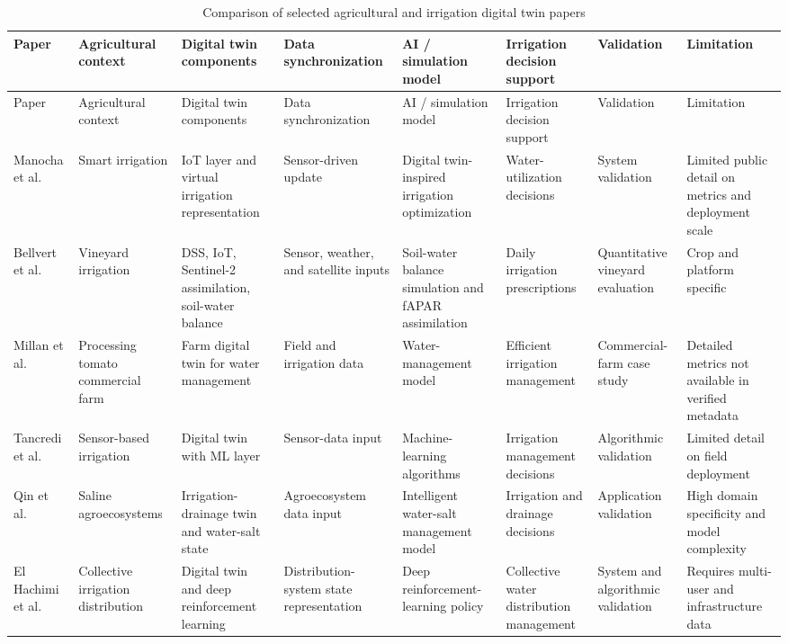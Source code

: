 \begingroup
\scriptsize
\setlength{\tabcolsep}{1pt}
\begin{longtable}{@{}>{\raggedright\arraybackslash}p{}>{\raggedright\arraybackslash}p{}>{\raggedright\arraybackslash}p{}>{\raggedright\arraybackslash}p{}>{\raggedright\arraybackslash}p{}>{\raggedright\arraybackslash}p{}>{\raggedright\arraybackslash}p{}>{\raggedright\arraybackslash}p{}@{}}
\caption{Comparison of selected agricultural and irrigation digital twin papers}\\
\toprule
Paper & Agricultural context & Digital twin components & Data synchronization & AI / simulation model & Irrigation decision support & Validation & Limitation \\
\midrule
\endfirsthead
\toprule
Paper & Agricultural context & Digital twin components & Data synchronization & AI / simulation model & Irrigation decision support & Validation & Limitation \\
\midrule
\endhead
Manocha et al. \cite{manocha2024iotdtirrigation} & Smart irrigation & IoT layer and virtual irrigation representation & Sensor-driven update & Digital twin-inspired irrigation optimization & Water-utilization decisions & System validation & Limited public detail on metrics and deployment scale \\
Bellvert et al. \cite{bellvert2023sentinel} & Vineyard irrigation & DSS, IoT, Sentinel-2 assimilation, soil-water balance & Sensor, weather, and satellite inputs & Soil-water balance simulation and fAPAR assimilation & Daily irrigation prescriptions & Quantitative vineyard evaluation & Crop and platform specific \\
Millan et al. \cite{millan2025tomatodt} & Processing tomato commercial farm & Farm digital twin for water management & Field and irrigation data & Water-management model & Efficient irrigation management & Commercial-farm case study & Detailed metrics not available in verified metadata \\
Tancredi et al. \cite{tancredi2025mldt} & Sensor-based irrigation & Digital twin with ML layer & Sensor-data input & Machine-learning algorithms & Irrigation management decisions & Algorithmic validation & Limited detail on field deployment \\
Qin et al. \cite{qin2025irrigationdrainagedt} & Saline agroecosystems & Irrigation-drainage twin and water-salt state & Agroecosystem data input & Intelligent water-salt management model & Irrigation and drainage decisions & Application validation & High domain specificity and model complexity \\
El Hachimi et al. \cite{elhachimi2025collectiveirrigation} & Collective irrigation distribution & Digital twin and deep reinforcement learning & Distribution-system state representation & Deep reinforcement-learning policy & Collective water distribution management & System and algorithmic validation & Requires multi-user and infrastructure data \\
\bottomrule
\end{longtable}
\endgroup

